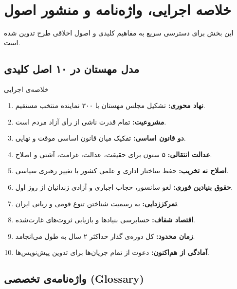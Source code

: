 \chapter{خلاصه اجرایی، واژه‌نامه و منشور اصول}
\label{app:summary_glossary}

این بخش برای دسترسی سریع به مفاهیم کلیدی و اصول اخلاقی طرح تدوین شده است.

\section{مدل مهستان در ۱۰ اصل کلیدی}

\begin{modernbox}{خلاصه‌ی اجرایی}
\begin{enumerate}
    \item \textbf{نهاد محوری:} تشکیل مجلس مهستان با ۳۰۰ نماینده منتخب مستقیم.
    \item \textbf{مشروعیت:} تمام قدرت ناشی از رأی آزاد مردم است.
    \item \textbf{دو قانون اساسی:} تفکیک میان قانون اساسی موقت و نهایی.
    \item \textbf{عدالت انتقالی:} ۵ ستون برای حقیقت، عدالت، غرامت، آشتی و اصلاح.
    \item \textbf{اصلاح نه تخریب:} حفظ ساختار اداری و علمی کشور با تغییر رهبری سیاسی.
    \item \textbf{حقوق بنیادین فوری:} لغو سانسور، حجاب اجباری و آزادی زندانیان از روز اول.
    \item \textbf{تمرکززدایی:} به رسمیت شناختن تنوع قومی و زبانی ایران.
    \item \textbf{اقتصاد شفاف:} حسابرسی بنیادها و بازیابی ثروت‌های غارت‌شده.
    \item \textbf{زمان محدود:} کل دوره‌ی گذار حداکثر ۲ سال به طول می‌انجامد.
    \item \textbf{آمادگی از هم‌اکنون:} دعوت از تمام جریان‌ها برای تدوین پیش‌نویس‌ها.
\end{enumerate}
\end{modernbox}

\section{واژه‌نامه‌ی تخصصی (Glossary)}

